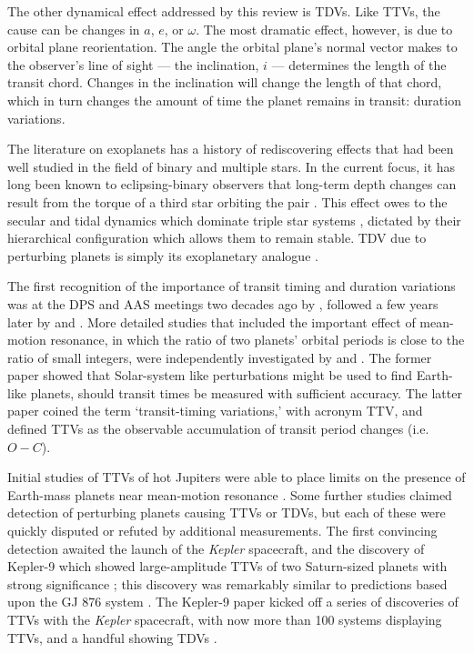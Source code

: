 \documentclass[graybox,natbib,nosecnum]{svmult}
\begin{document}
The other dynamical effect addressed by this review is TDVs.  Like TTVs, the cause can be changes in $a$, $e$, or $\omega$.  The most dramatic effect, however, is due to orbital plane reorientation.  The angle the orbital plane's normal vector makes to the observer's line of sight --- the inclination, $i$ --- determines the length of the transit chord.  Changes in the inclination will change the length of that chord, which in turn changes the amount of time the planet remains in transit: duration variations. 

The literature on exoplanets has a history of rediscovering effects that had been well studied in the field of binary and multiple stars.  In the current focus, it has long been known to eclipsing-binary observers that long-term depth changes can result from the torque of a third star orbiting the pair \citep{1971Mayer}.  This effect owes to the secular and tidal dynamics which dominate triple star systems \citep{2003A&A...398.1091B}, dictated by their hierarchical configuration which allows them to remain stable. TDV due to perturbing planets is simply its exoplanetary analogue \citep{2002ApJ...564.1019M}.

The first recognition of the importance of transit timing and duration variations was at the DPS and AAS meetings two decades ago by \citet{1996DPS....28.1208D,1996BAAS...28.1112D}, followed a few years later by \citet{2002ApJ...564.1019M} and \citet{Schneider2003,Schneider2004}.  More detailed studies that included the important effect of mean-motion resonance, in which the ratio of two planets' orbital periods is close to the ratio of small integers, were independently investigated by \citet{2005Sci...307.1288H} and \citet{2005MNRAS.359..567A}.  The former paper showed that Solar-system like perturbations might be used to find Earth-like planets, should transit times be measured with sufficient accuracy.  The latter paper coined the term `transit-timing variations,' with acronym TTV, and defined TTVs as the observable accumulation of transit period changes (i.e.\ $O-C$).

Initial studies of TTVs of hot Jupiters were able to place limits on the presence of Earth-mass planets near mean-motion resonance \citep{2005MNRAS.364L..96S}.  Some further studies claimed detection of perturbing planets causing TTVs or TDVs, but each of these were quickly disputed or refuted by additional measurements.  The first convincing detection awaited the launch of the \emph{Kepler} spacecraft, and the discovery of Kepler-9 which showed large-amplitude TTVs of two Saturn-sized planets with strong significance \citep{2010Sci...330...51H}; this discovery was remarkably similar to predictions based upon the GJ 876 system \citep{2005MNRAS.359..567A}.  The Kepler-9 paper kicked off a series of discoveries of TTVs with the \emph{Kepler} spacecraft, with now more than 100 systems displaying TTVs, and a handful showing TDVs \citep{2016ApJS..225....9H}.
\end{document}
